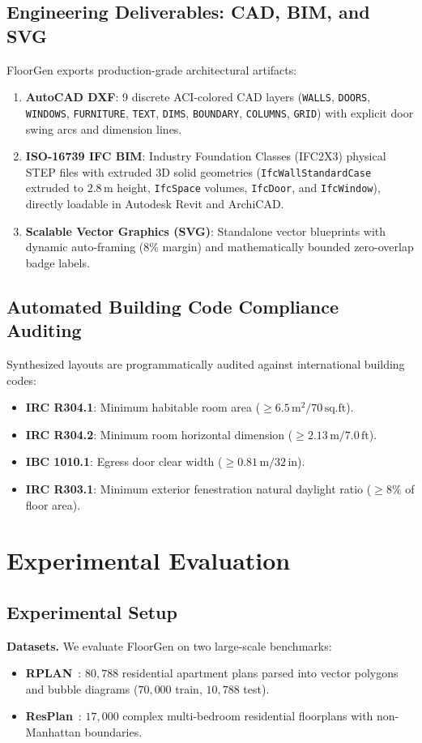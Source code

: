 \documentclass[journal]{IEEEtran}
\begin{document}
\subsection{Engineering Deliverables: CAD, BIM, and SVG}
FloorGen exports production-grade architectural artifacts:
\begin{enumerate}
    \item \textbf{AutoCAD DXF}: 9 discrete ACI-colored CAD layers (\texttt{WALLS}, \texttt{DOORS}, \texttt{WINDOWS}, \texttt{FURNITURE}, \texttt{TEXT}, \texttt{DIMS}, \texttt{BOUNDARY}, \texttt{COLUMNS}, \texttt{GRID}) with explicit door swing arcs and dimension lines.
    \item \textbf{ISO-16739 IFC BIM}: Industry Foundation Classes (IFC2X3) physical STEP files with extruded 3D solid geometries (\texttt{IfcWallStandardCase} extruded to $2.8\,\mathrm{m}$ height, \texttt{IfcSpace} volumes, \texttt{IfcDoor}, and \texttt{IfcWindow}), directly loadable in Autodesk Revit and ArchiCAD.
    \item \textbf{Scalable Vector Graphics (SVG)}: Standalone vector blueprints with dynamic auto-framing (8\% margin) and mathematically bounded zero-overlap badge labels.
\end{enumerate}

\subsection{Automated Building Code Compliance Auditing}
Synthesized layouts are programmatically audited against international building codes:
\begin{itemize}
    \item \textbf{IRC R304.1}: Minimum habitable room area ($\ge 6.5\,\mathrm{m}^2 / 70\,\text{sq.ft}$).
    \item \textbf{IRC R304.2}: Minimum room horizontal dimension ($\ge 2.13\,\mathrm{m} / 7.0\,\text{ft}$).
    \item \textbf{IBC 1010.1}: Egress door clear width ($\ge 0.81\,\mathrm{m} / 32\,\text{in}$).
    \item \textbf{IRC R303.1}: Minimum exterior fenestration natural daylight ratio ($\ge 8\%$ of floor area).
\end{itemize}

\section{Experimental Evaluation}

\subsection{Experimental Setup}
\noindent\textbf{Datasets.} We evaluate FloorGen on two large-scale benchmarks:
\begin{itemize}
    \item \textbf{RPLAN}~\cite{wu2019data}: $80{,}788$ residential apartment plans parsed into vector polygons and bubble diagrams ($70{,}000$ train, $10{,}788$ test).
    \item \textbf{ResPlan}~\cite{abouagour2025resplan}: $17{,}000$ complex multi-bedroom residential floorplans with non-Manhattan boundaries.
\end{itemize}
\end{document}
